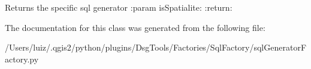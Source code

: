 \begin{DoxyVerb}Returns the specific sql generator
:param isSpatialite:
:return:
\end{DoxyVerb}
 

The documentation for this class was generated from the following file\+:\begin{DoxyCompactItemize}
\item 
/\+Users/luiz/.\+qgis2/python/plugins/\+Dsg\+Tools/\+Factories/\+Sql\+Factory/sql\+Generator\+Factory.\+py\end{DoxyCompactItemize}
